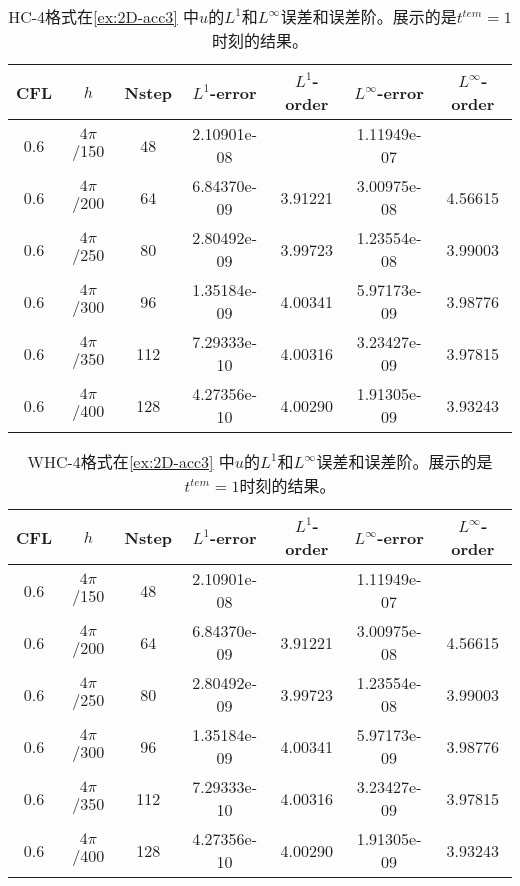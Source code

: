\def\titleintable{CFL&$h$&Nstep&$L^1$-error&$L^1$-order&$L^\infty$-error&$L^\infty$-order\\}
\begin{table}[htbp]
  \caption{HC-4格式在\cref{ex:2D-acc3} 中$u$的$L^1$和$L^\infty$误差和误差阶。展示的是$t^{tem} = 1$时刻的结果。}
  \label{ta:2D-ex3-HC4}
  \centering
  \begin{tabular}{ccccccc}
    \toprule
    \titleintable
    \midrule
    0.6 & $4\pi$/150 & 48  & 2.10901e-08 &         & 1.11949e-07 &         \\
    0.6 & $4\pi$/200 & 64  & 6.84370e-09 & 3.91221 & 3.00975e-08 & 4.56615 \\
    0.6 & $4\pi$/250 & 80  & 2.80492e-09 & 3.99723 & 1.23554e-08 & 3.99003 \\
    0.6 & $4\pi$/300 & 96  & 1.35184e-09 & 4.00341 & 5.97173e-09 & 3.98776 \\
    0.6 & $4\pi$/350 & 112 & 7.29333e-10 & 4.00316 & 3.23427e-09 & 3.97815 \\
    0.6 & $4\pi$/400 & 128 & 4.27356e-10 & 4.00290 & 1.91305e-09 & 3.93243 \\
    \bottomrule
  \end{tabular}
\end{table}

\begin{table}[htbp]
  \caption{WHC-4格式在\cref{ex:2D-acc3} 中$u$的$L^1$和$L^\infty$误差和误差阶。展示的是$t^{tem} = 1$时刻的结果。}
  \label{ta:2D-ex3-WHC4}
  \centering
  \begin{tabular}{ccccccc}
    \toprule
    \titleintable
    \midrule
    0.6 & $4\pi$/150 & 48  & 2.10901e-08 &         & 1.11949e-07 &         \\
    0.6 & $4\pi$/200 & 64  & 6.84370e-09 & 3.91221 & 3.00975e-08 & 4.56615 \\
    0.6 & $4\pi$/250 & 80  & 2.80492e-09 & 3.99723 & 1.23554e-08 & 3.99003 \\
    0.6 & $4\pi$/300 & 96  & 1.35184e-09 & 4.00341 & 5.97173e-09 & 3.98776 \\
    0.6 & $4\pi$/350 & 112 & 7.29333e-10 & 4.00316 & 3.23427e-09 & 3.97815 \\
    0.6 & $4\pi$/400 & 128 & 4.27356e-10 & 4.00290 & 1.91305e-09 & 3.93243 \\
    \bottomrule
  \end{tabular}
\end{table}

